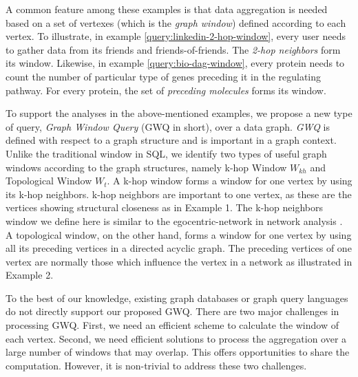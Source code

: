 A common feature among these examples is that data aggregation is needed based on a set of vertexes (which is the {\em graph window}) 
defined according to each vertex.  To illustrate, in example \ref{query:linkedin-2-hop-window}, every user needs to gather data from its friends and friends-of-friends. 
The \emph{2-hop neighbors} form its window. Likewise, in example \ref{query:bio-dag-window}, every protein needs to count the number of particular type of genes preceding it in the regulating pathway. For every protein, the set of
\emph{preceding molecules} forms its window. 

To support the analyses in the above-mentioned examples, we propose a new 
type of query, \emph{Graph Window Query} (GWQ in short),
over a data graph. \emph{GWQ} is defined with respect to a graph structure 
and is important in a graph context. Unlike the traditional window in SQL, 
we identify two types of useful graph windows according to the 
graph structures, namely k-hop Window $W_{kh}$ and Topological Window $W_t$. 
A k-hop window forms a window for one vertex by using its k-hop neighbors. 
k-hop neighbors are important to one vertex, as these are the vertices 
showing structural closeness as in Example 1. The k-hop neighbors window 
we define here is similar to the egocentric-network in network analysis \cite{burt2009structural} \cite{mondal2014eagr}. A topological window, on the
other hand, forms a window for one vertex by using all its preceding 
vertices in a directed acyclic graph. The preceding vertices of one vertex are normally those which influence the vertex in a network as illustrated in Example 2. 

To the best of our knowledge, existing graph databases or graph query languages do not directly support our proposed GWQ. There are two major challenges in processing GWQ. First, we need an efficient scheme to  calculate the window of each vertex. Second, we need
efficient solutions to process the aggregation over a large number 
of windows that may overlap. This offers opportunities to share the 
computation. However, it is non-trivial to address these two challenges.  

